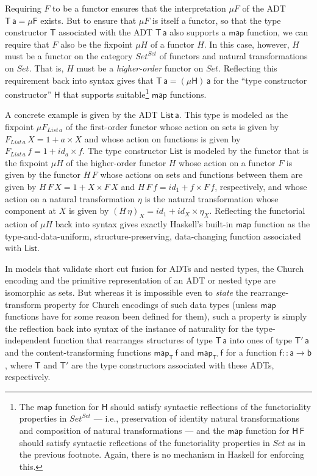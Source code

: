 \documentclass[acmsmall,screen,review,anonymous]{acmart}
\theoremstyle{definition}
\renewcommand{\id}{\mathit{id}}
\begin{document}
Requiring $F$ to be a functor ensures that the interpretation $\mu F$
of the ADT $\mathsf{T\,a} = \mathsf{\mu F}$ exists. But to ensure that
$\mu F$ is itself a functor, so that the type constructor $\mathsf{T}$
associated with the ADT $\mathsf{T\,a}$ also supports a $\mathsf{map}$
function, we can require that $F$ also be the fixpoint $\mu H$ of a
functor $H$. In this case, however, $H$ must be a functor on the
category $\mathit{Set}^\mathit{Set}$ of functors and natural
transformations on $\mathit{Set}$. That is, $H$ must be a {\em
  higher-order} functor on $\mathit{Set}$. Reflecting this requirement
back into syntax gives that $\mathsf{T\,a} = \mathsf{(\mu H)\,a}$ for
the ``type constructor constructor'' $\mathsf{H}$ that supports
suitable\footnote{The $\mathsf{map}$ function for $\mathsf{H}$ should
  satisfy syntactic reflections of the functoriality properties in
  $\mathit{Set}^\mathit{Set}$ --- i.e., preservation of identity
  natural transformations and composition of natural transformations
  --- and the $\mathsf{map}$ function for $\mathsf{H\,F}$ should
  satisfy syntactic reflections of the functoriality properties in
  $\mathit{Set}$ as in the previous footnote. Again, there is no
  mechanism in Haskell for enforcing this.} $\mathsf{map}$ functions.

A concrete example is given by the ADT $\mathsf{List\,a}$. This type
is modeled as the fixpoint $\mu F_{\mathit{List\,a}}$ of the
first-order functor whose action on sets is given by
$F_{\mathit{List}\,a}\,X = 1 + a \times X$ and whose action on
functions is given by $F_{\mathit{List}\,a}\,f = 1 + \id_a \times
f$. The type constructor $\mathsf{List}$ is modeled by the functor
that is the fixpoint $\mu H$ of the higher-order functor $H$ whose
action on a functor $F$ is given by the functor $H\,F$ whose actions
on sets and functions between them are given by $H\,F\,X = 1 + X
\times F\,X$ and $H\,F\,f = \id_1 + f \times F\,f$, respectively, and
whose action on a natural transformation $\eta$ is the natural
transformation whose component at $X$ is given by $(H\,\eta)_X = \id_1
+ \id_X \times \eta_X$. Reflecting the functorial action of $\mu H$
back into syntax gives exactly Haskell's built-in $\mathsf{map}$
function as the type-and-data-uniform, structure-preserving,
data-changing function associated with $\mathsf{List}$.

\vspace*{0.05in}

In models that validate short cut fusion for ADTs and nested types,
the Church encoding and the primitive representation of an ADT or
nested type are isomorphic as sets. But whereas it is impossible even
to {\em state} the rearrange-transform property for Church encodings
of such data types (unless $\mathsf{map}$ functions have for some
reason been defined for them), such a property is simply the
reflection back into syntax of the instance of naturality for the
type-independent function that rearranges structures of type
$\mathsf{T\,a}$ into ones of type $\mathsf{T'\,a}$ and the
content-transforming functions $\mathsf{map_T\,f}$ and
$\mathsf{map_{T'}\,f}$ for a function $\mathsf{f :: a \to b}$, where
$\mathsf{T}$ and $\mathsf{T'}$ are the type constructors associated
with these ADTs, respectively.
\end{document}
